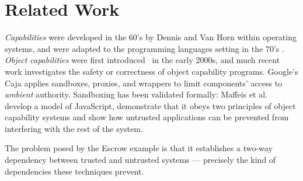 \section{Related Work}
\label{section:related-work}

{\em Capabilities} were developed in the 60's
by Dennis and Van Horn \cite{Dennis66} within operating systems, and
were adapted to the 
programming languages setting in the 70's \cite{JamesMorris}. 
{\em Object capabilities} were first introduced~\cite{MillerPhD} in the early 2000s,
and much recent work investigates 
the safety or correctness of object capability programs.
Google's Caja \cite{Caja} applies   sandboxes, proxies, and wrappers
to limit components'
access to \textit{ambient} authority.
Sandboxing has been validated
formally: Maffeis et al.\ \cite{mmt-oakland10} develop a model of
JavaScript, demonstrate that it obeys two principles of
object capability systems
and show  how untrusted applications can be prevented from interfering with
the rest of the system. 

The problem posed by the Escrow example is that it establishes a two-way
dependency between trusted and untrusted systems --- precisely the
kind of dependencies these techniques prevent.

